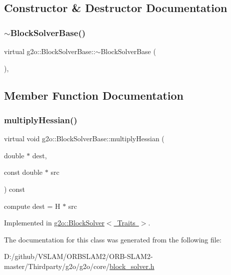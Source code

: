 \subsection{Constructor \& Destructor Documentation}
\mbox{\label{classg2o_1_1_block_solver_base_a59aabc7d24599a7f7b251cc0040bcb0a}} 
\subsubsection{\texorpdfstring{$\sim$\+Block\+Solver\+Base()}{~BlockSolverBase()}}
{\footnotesize\ttfamily virtual g2o\+::\+Block\+Solver\+Base\+::$\sim$\+Block\+Solver\+Base (\begin{DoxyParamCaption}{ }\end{DoxyParamCaption})\hspace{0.3cm}{\ttfamily [inline]}, {\ttfamily [virtual]}}



\subsection{Member Function Documentation}
\mbox{\label{classg2o_1_1_block_solver_base_a4ff7072751bfa1b7fcf91f8219e18e13}} 
\subsubsection{\texorpdfstring{multiply\+Hessian()}{multiplyHessian()}}
{\footnotesize\ttfamily virtual void g2o\+::\+Block\+Solver\+Base\+::multiply\+Hessian (\begin{DoxyParamCaption}\item[{double $\ast$}]{dest,  }\item[{const double $\ast$}]{src }\end{DoxyParamCaption}) const\hspace{0.3cm}{\ttfamily [pure virtual]}}

compute dest = H $\ast$ src 

Implemented in \mbox{\hyperlink{classg2o_1_1_block_solver_a6eb8f0729e8bcd760e629421cfa7202c}{g2o\+::\+Block\+Solver$<$ Traits $>$}}.



The documentation for this class was generated from the following file\+:\begin{DoxyCompactItemize}
\item 
D\+:/github/\+V\+S\+L\+A\+M/\+O\+R\+B\+S\+L\+A\+M2/\+O\+R\+B-\/\+S\+L\+A\+M2-\/master/\+Thirdparty/g2o/g2o/core/\mbox{\hyperlink{block__solver_8h}{block\+\_\+solver.\+h}}\end{DoxyCompactItemize}
